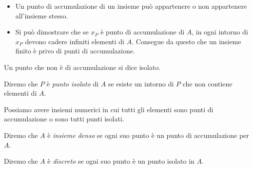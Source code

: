 \begin{newoss}{}{}
\begin{itemize} [nosep]
\item Un punto di accumulazione di un insieme può appartenere 
o non appartenere all'insieme stesso.
\item Si può dimostrare che se \(x_P\) è punto di 
accumulazione di \(A\), in ogni intorno di \(x_P\) devono cadere infiniti 
elementi di \(A\). Consegue da questo che un insieme finito è privo di punti 
di accumulazione.
\end{itemize}
\end{newoss}

Un punto che non è di accumulazione si dice isolato.
% 

\begin{newdef}{}{}
Diremo che \(P\) è \emph{punto isolato} di \(A\) se esiste un intorno 
di \(P\) che non contiene elementi di \(A\).
\end{newdef}

Possiamo avere insiemi numerici in cui tutti gli elementi sono punti di 
accumulazione o sono tutti punti isolati.

\begin{newdef}{}{}
Diremo che \(A\) è \emph{insieme denso} se ogni suo punto è un punto di 
accumulazione per \(A\).
\end{newdef}

\begin{newdef}{}{}
Diremo che \(A\) è \emph{discreto} se ogni suo punto è un punto isolato in 
\(A\).
\end{newdef}

\begin{comment}
\affiancati{.49}{.49}{
\begin{newdef}{}{}
:
\[\]
\end{newdef}
}{
\begin{newdef}{}{}
:
\[\]
\end{newdef}
}
\end{comment}

